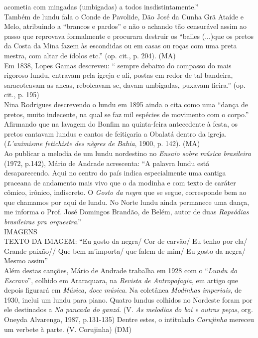 acometia com mingadas (umbigadas) a todos insdistintamente.''\\
Também de lundu fala o Conde de Pavolide, Dão José da Cunha Grã Ataíde e
Melo, atribuindo a ``brancos e pardos'' e não o achando tão censurável
assim ao passo que reprovava formalmente e procurara destruir os
``bailes (...)que os pretos da Costa da Mina fazem às escondidas ou em
casas ou roças com uma preta mestra, com altar de ídolos etc.'' (op.
cit., p. 204). (MA)\\
Em 1838, Lopes Gamas descreveu: `` sempre debaixo do compasso do mais
rigoroso lundu, entravam pela igreja e ali, postas em redor de tal
bandeira, saracoteavam as ancas, reboleavam-se, davam umbigadas, puxavam
fieira.'' (op. cit., p. 195)\\
Nina Rodrigues descrevendo o lundu em 1895 ainda o cita como uma ``dança
de pretos, muito indecente, na qual se faz mil espécies de movimento com
o corpo.'' Afirmando que na lavagem do Bonfim na quinta-feira
antecedente à festa, os pretos cantavam lundus e cantos de feitiçaria a
Obalatá dentro da igreja. (\emph{L'animisme fetichiste des nègres de
Bahia}, 1900, p. 142). (MA)\\
Ao publicar a melodia de um lundu nordestino no \emph{Ensaio sobre
música brasileira} (1972, p.142), Mário de Andrade acrescenta: ``A
palavra lundu está desaparecendo. Aqui no centro do país indica
especialmente uma cantiga praceana de andamento mais vivo que o da
modinha e com texto de caráter cômico, irônico, indiscreto. O
\emph{Gosto da negra} que se segue, corresponde bem ao que chamamos por
aqui de lundu. No Norte lundu ainda permanece uma dança, me informa o
Prof. José Domingos Brandão, de Belém, autor de duas \emph{Rapsódias
brasileiras pra orquestra}.''\\[2\baselineskip]IMAGENS\\
TEXTO DA IMAGEM: ``Eu gosto da negra/ Cor de carvão/ Eu tenho por ela/
Grande paixão// Que bem m'importa/ que falem de mim/ Eu gosto da negra/
Mesmo assim''\\[2\baselineskip]Além destas canções, Mário de Andrade
trabalha em 1928 com o ``\emph{Lundu do Escravo}'', colhido em
Araraquara, na \emph{Revista de Antropofagia}, em artigo que depois
figurará em \emph{Música, doce música}. Na coletânea \emph{Modinhas
imperiais}, de 1930, inclui um lundu para piano. Quatro lundus colhidos
no Nordeste foram por ele destinados a \emph{Na pancada do ganzá}. (V.
\emph{As melodias do boi e outras peças}, org. Oneyda Alvarenga, 1987,
p.131-135) Dentre estes, o intitulado \emph{Corujinha} mereceu um
verbete à parte. (V. Corujinha) (DM)

